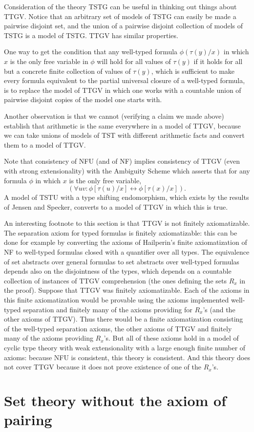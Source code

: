 \documentclass[12pt]{article}
\begin{document}
Consideration of the theory TSTG can be useful in thinking out things about TTGV.  Notice that
an arbitrary set of models of TSTG can easily be made a pairwise disjoint set, and the union of a pairwise disjoint collection of models of TSTG is a model of TSTG.  TTGV has similar properties.

One way to get the condition that any well-typed formula $\phi(\tau(y)/x)$ in which $x$ is the only free variable in $\phi$
will hold for all values of $\tau(y)$ if it holds for all but a concrete finite collection of values of $\tau(y)$, which is sufficient to make every formula equivalent to the partial universal closure of a well-typed formula, is to replace the model of TTGV in which one works with a countable union of pairwise disjoint copies of the model one starts with.

Another observation is that we cannot (verifying a claim we made above) establish that arithmetic is the same everywhere in a model of TTGV, because we can take unions of models of TST with different arithmetic facts and convert them to a model of TTGV.

Note that consistency of NFU (and of NF) implies consistency of TTGV (even with strong extensionality) with the Ambiguity Scheme which asserts that for any  formula $\phi$ in which $x$ is the only free variable, $$(\forall uv:\phi[\tau(u)/x]\leftrightarrow \phi[\tau(x)/x]).$$  A model of TSTU with a type shifting endomorphism, which exists by the results of Jensen and Specker, converts to a model of TTGV in which this is true.

An interesting footnote to this section is that TTGV is not finitely axiomatizable.  The separation axiom for typed formulas is finitely axiomatizable:  this can be done for example by converting the axioms of Hailperin's finite axiomatization of NF to well-typed formulas closed with a quantifier over all types.  The equivalence of set abstracts over general formulas to set abstracts over well-typed formulas depends also on the disjointness of the types, which depends on a countable collection
of instances of TTGV comprehension (the ones defining the sets $R_x$ in the proof).  Suppose that TTGV was finitely axiomatizable.  Each of the axioms in this finite axiomatization would be provable using the axioms implemented well-typed separation and finitely many of the axioms providing for $R_x$'s (and the other axioms of TTGV).  Thus there would be a finite axiomatization consisting of the well-typed separation axioms, the other axioms of TTGV and finitely many of the axioms providing $R_x$'s.  But all of these axioms hold in a model of cyclic type theory with weak extensionality with a large enough finite number of axioms:  because NFU is consistent, this theory is consistent.  And this theory does not cover TTGV because it does not prove existence of one of the $R_x$'s.

\section{Set theory without the axiom of pairing}
\end{document}
